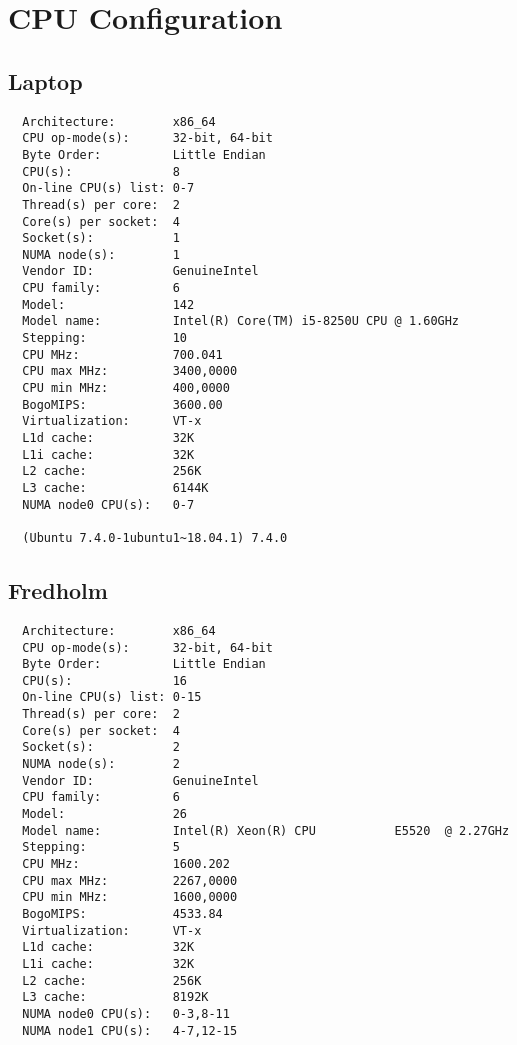 \section{CPU Configuration}
\subsection{Laptop}
\begin{verbatim}
  Architecture:        x86_64
  CPU op-mode(s):      32-bit, 64-bit
  Byte Order:          Little Endian
  CPU(s):              8
  On-line CPU(s) list: 0-7
  Thread(s) per core:  2
  Core(s) per socket:  4
  Socket(s):           1
  NUMA node(s):        1
  Vendor ID:           GenuineIntel
  CPU family:          6
  Model:               142
  Model name:          Intel(R) Core(TM) i5-8250U CPU @ 1.60GHz
  Stepping:            10
  CPU MHz:             700.041
  CPU max MHz:         3400,0000
  CPU min MHz:         400,0000
  BogoMIPS:            3600.00
  Virtualization:      VT-x
  L1d cache:           32K
  L1i cache:           32K
  L2 cache:            256K
  L3 cache:            6144K
  NUMA node0 CPU(s):   0-7

  (Ubuntu 7.4.0-1ubuntu1~18.04.1) 7.4.0

\end{verbatim}\textbf{}
\newpage
\subsection{Fredholm}
\begin{verbatim}
  Architecture:        x86_64
  CPU op-mode(s):      32-bit, 64-bit
  Byte Order:          Little Endian
  CPU(s):              16
  On-line CPU(s) list: 0-15
  Thread(s) per core:  2
  Core(s) per socket:  4
  Socket(s):           2
  NUMA node(s):        2
  Vendor ID:           GenuineIntel
  CPU family:          6
  Model:               26
  Model name:          Intel(R) Xeon(R) CPU           E5520  @ 2.27GHz
  Stepping:            5
  CPU MHz:             1600.202
  CPU max MHz:         2267,0000
  CPU min MHz:         1600,0000
  BogoMIPS:            4533.84
  Virtualization:      VT-x
  L1d cache:           32K
  L1i cache:           32K
  L2 cache:            256K
  L3 cache:            8192K
  NUMA node0 CPU(s):   0-3,8-11
  NUMA node1 CPU(s):   4-7,12-15

\end{verbatim}
\newpage
